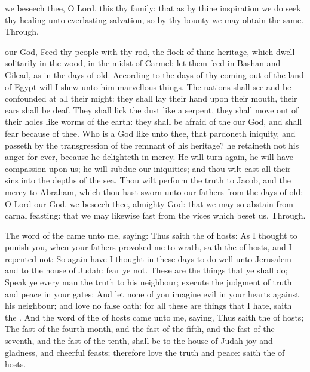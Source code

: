 \collect
{} we beseech thee, O Lord, this thy family: that as by thine inspiration we do seek thy healing unto everlasting salvation, so by thy bounty we may obtain the same. Through.

 our God, Feed thy people with thy rod, the flock of thine heritage, which dwell solitarily in the wood, in the midst of Carmel: let them feed in Bashan and Gilead, as in the days of old. According to the days of thy coming out of the land of Egypt will I shew unto him marvellous things. The nations shall see and be confounded at all their might: they shall lay their hand upon their mouth, their ears shall be deaf. They shall lick the dust like a serpent, they shall move out of their holes like worms of the earth: they shall be afraid of the  our God, and shall fear because of thee. Who is a God like unto thee, that pardoneth iniquity, and passeth by the transgression of the remnant of his heritage? he retaineth not his anger for ever, because he delighteth in mercy. He will turn again, he will have compassion upon us; he will subdue our iniquities; and thou wilt cast all their sins into the depths of the sea. Thou wilt perform the truth to Jacob, and the mercy to Abraham, which thou hast sworn unto our fathers from the days of old: O Lord our God.
\collect
{} we beseech thee, almighty God: that we may so abstain from carnal feasting: that we may likewise fast from the vices which beset us. Through.

 The word of the  came unto me, saying: Thus saith the  of hosts: As I thought to punish you, when your fathers provoked me to wrath, saith the  of hosts, and I repented not: So again have I thought in these days to do well unto Jerusalem and to the house of Judah: fear ye not. These are the things that ye shall do; Speak ye every man the truth to his neighbour; execute the judgment of truth and peace in your gates: And let none of you imagine evil in your hearts against his neighbour; and love no false oath: for all these are things that I hate, saith the . And the word of the  of hosts came unto me, saying, Thus saith the  of hosts; The fast of the fourth month, and the fast of the fifth, and the fast of the seventh, and the fast of the tenth, shall be to the house of Judah joy and gladness, and cheerful feasts; therefore love the truth and peace: saith the  of hosts.

